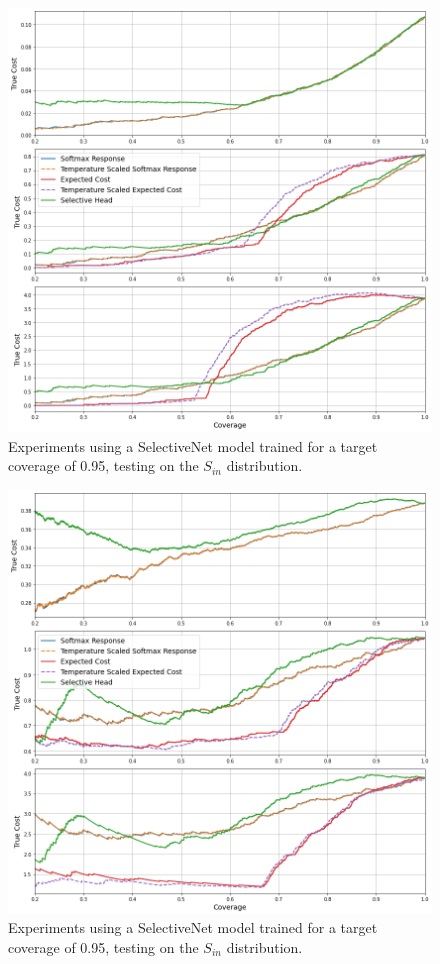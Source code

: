 \begin{figure}[H]
	\includegraphics[width=\textwidth]{images/binary/sn0.95_in_distribution.png}
	\caption*{Experiments using a SelectiveNet model trained for a target coverage of 0.95, testing on the $S_{in}$ distribution.}
\end{figure}

\begin{figure}[H]
	\includegraphics[width=\textwidth]{images/binary/sn0.95_out_distribution.png}
	\caption*{Experiments using a SelectiveNet model trained for a target coverage of 0.95, testing on the $S_{in}$ distribution.}
\end{figure}

